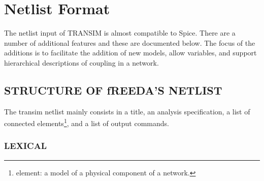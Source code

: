 \chapter{Netlist Format}\label{ch_netlist}

The netlist input of TRANSIM is almost compatible to Spice.  There are
a number of additional features and these are documented below.  The
focus of the additions is to facilitate the addition of new models,
allow variables, and support hierarchical descriptions of coupling in
a network.

\section[Structure of fREEDA's Netlist]{STRUCTURE OF fREEDA'S NETLIST}

The transim netlist mainly consists in a title, an analysis
specification, a list of connected elements\footnote{element: a model
of a physical component of a network.}, and a list of output commands.

\subsection[Lexical]{LEXICAL}

